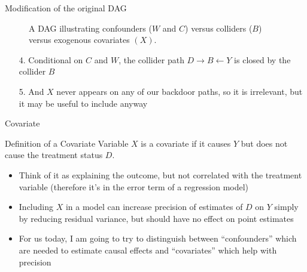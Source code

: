 \documentclass{beamer}
\begin{document}
\begin{frame}{Modification of the original DAG}

\begin{figure}
\begin{center}
\caption{A DAG illustrating confounders ($W$ and $C$) versus colliders ($B$) versus exogenous covariates $(X)$.}
\label{fig:backdoor_dag}
\end{center}
\end{figure}

\begin{enumerate}
\item[4. ] Conditional on $C$ and $W$, the collider path $D \rightarrow B \leftarrow Y$ is closed by the collider $B$
\item[5. ] And $X$ never appears on any of our backdoor paths, so it is irrelevant, but it may be useful to include anyway
\end{enumerate}


\end{frame}




\begin{frame}{Covariate}
	
	
	\begin{block}{Definition of a Covariate}
	Variable $X$ is a covariate if it causes $Y$ but does not cause the treatment status $D$.
	\end{block}
	
	\begin{itemize}
	\item Think of it as explaining the outcome, but not correlated with the treatment variable (therefore it's in the error term of a regression model)
	\item Including $X$ in a model can increase precision of estimates of $D$ on $Y$ simply by reducing residual variance, but should have no effect on point estimates
	\item For us today, I am going to try to distinguish between ``confounders'' which are needed to estimate causal effects and ``covariates'' which help with precision 
	\end{itemize}
	
\end{frame}
\end{document}
